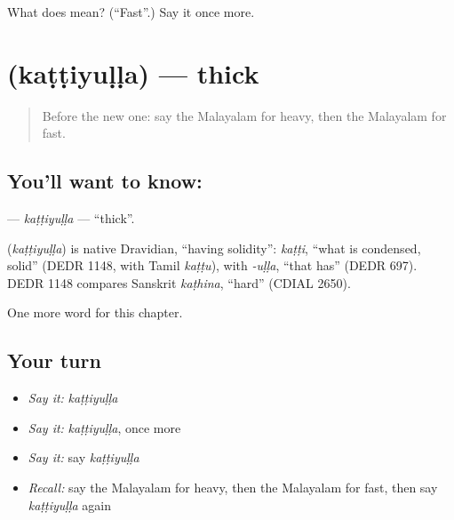 \begin{tcolorbox}[breakable,colback=teal!4,colframe=teal!35!black,title={Before you move on}]
What does  mean? (\textquotedblleft{}Fast\textquotedblright{}.) Say it once more.
\end{tcolorbox}
\section[\texorpdfstring{\ml{കട്ടിയുള്ള} (kaṭṭiyuḷḷa)}{കട്ടിയുള്ള (kaṭṭiyuḷḷa)}]{ (kaṭṭiyuḷḷa) — thick}

\label{lesson:ML-C166-kattiyulla}



\begin{quote}
Before the new one: say the Malayalam for heavy, then the Malayalam for fast.
\end{quote}

\subsection*{You'll want to know: }
\textbf{} — \emph{kaṭṭiyuḷḷa} — \textquotedblleft{}thick\textquotedblright{}.

\begin{cousinweb}
\textbf{} (\emph{kaṭṭiyuḷḷa}) is native Dravidian, \textquotedblleft{}having solidity\textquotedblright{}: \emph{kaṭṭi}, \textquotedblleft{}what is condensed, solid\textquotedblright{} (DEDR 1148, with Tamil \emph{kaṭṭu}), with \emph{-uḷḷa}, \textquotedblleft{}that has\textquotedblright{} (DEDR 697). DEDR 1148 compares Sanskrit \emph{kaṭhina}, \textquotedblleft{}hard\textquotedblright{} (CDIAL 2650).
\end{cousinweb}

\begin{grammarlens}[title={What you've built}]
One more word for this chapter.
\end{grammarlens}

\subsection*{Your turn}
\begin{itemize}
\raggedright
  \item \emph{Say it:} \emph{kaṭṭiyuḷḷa}
  \item \emph{Say it:} \emph{kaṭṭiyuḷḷa}, once more
  \item \emph{Say it:} say \emph{kaṭṭiyuḷḷa}
  \item \emph{Recall:} say the Malayalam for heavy, then the Malayalam for fast, then say \emph{kaṭṭiyuḷḷa} again
\end{itemize}

